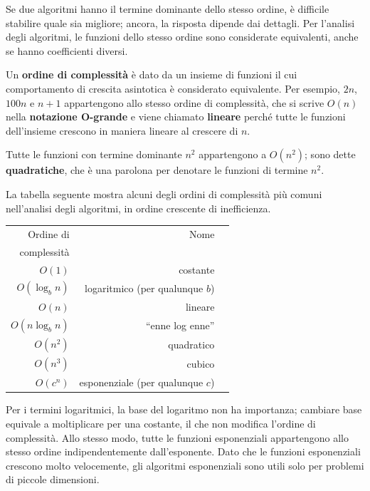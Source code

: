 \documentclass[10pt]{book}
\begin{document}
Se due algoritmi hanno il termine dominante dello stesso ordine, è difficile stabilire quale sia migliore; ancora, la risposta dipende dai dettagli. Per l'analisi degli algoritmi, le funzioni dello stesso ordine sono considerate equivalenti, anche se hanno coefficienti diversi.

Un {\bf ordine di complessità} è dato da un insieme di funzioni il cui comportamento di crescita asintotica è considerato equivalente.  Per esempio, $2n$, $100n$ e $n+1$ appartengono allo stesso ordine di complessità, che si scrive $O(n)$ nella {\bf notazione O-grande} e viene chiamato {\bf lineare} perché tutte le funzioni dell'insieme crescono in maniera lineare al crescere di $n$.

Tutte le funzioni con termine dominante $n^2$ appartengono a $O(n^2)$; sono dette {\bf quadratiche}, che è una parolona per denotare le funzioni di termine $n^2$.

La tabella seguente mostra alcuni degli ordini di complessità più comuni nell'analisi degli algoritmi, in ordine crescente di inefficienza.

\begin{tabular}{|r|r|r|}
\hline
Ordine di     &   Nome      \\
complessità       &               \\
\hline
$O(1)$             & costante \\
$O(\log_b n)$      & logaritmico (per qualunque $b$) \\
$O(n)$             & lineare \\
$O(n \log_b n)$    & ``enne log enne'' \\
$O(n^2)$           & quadratico     \\
$O(n^3)$           & cubico     \\
$O(c^n)$           & esponenziale (per qualunque $c$)    \\
\hline
\end{tabular}

Per i termini logaritmici, la base del logaritmo non ha importanza; cambiare base equivale a moltiplicare per una costante, il che non modifica l'ordine di complessità. Allo stesso modo, tutte le funzioni esponenziali appartengono allo stesso ordine indipendentemente dall'esponente. Dato che le funzioni esponenziali crescono molto velocemente, gli algoritmi esponenziali sono utili solo per problemi di piccole dimensioni.
\end{document}
